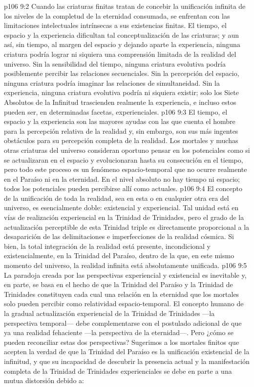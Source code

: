 \vs p106 9:2 Cuando las criaturas finitas tratan de concebir la unificación infinita de los niveles de la completud de la eternidad consumada, se enfrentan con las limitaciones intelectuales intrínsecas a sus existencias finitas. El tiempo, el espacio y la experiencia dificultan tal conceptualización de las criaturas; y aun así, sin tiempo, al margen del espacio y dejando aparte la experiencia, ninguna criatura podría lograr ni siquiera una comprensión limitada de la realidad del universo. Sin la sensibilidad del tiempo, ninguna criatura evolutiva podría posiblemente percibir las relaciones secuenciales. Sin la percepción del espacio, ninguna criatura podría imaginar las relaciones de simultaneidad. Sin la experiencia, ninguna criatura evolutiva podría ni siquiera existir; solo los Siete Absolutos de la Infinitud trascienden realmente la experiencia, e incluso estos pueden ser, en determinadas facetas, experienciales.
\vs p106 9:3 El tiempo, el espacio y la experiencia son las mayores ayudas con las que cuenta el hombre para la percepción relativa de la realidad y, sin embargo, son sus más ingentes obstáculos para su percepción completa de la realidad. Los mortales y muchas otras criaturas del universo consideran oportuno pensar en los potenciales como si se actualizaran en el espacio y evolucionaran hasta su consecución en el tiempo, pero todo este proceso es un fenómeno espacio\hyp{}temporal que no ocurre realmente en el Paraíso ni en la eternidad. En el nivel absoluto no hay tiempo ni espacio; todos los potenciales pueden percibirse allí como actuales.
\vs p106 9:4 El concepto de la unificación de toda la realidad, sea en esta o en cualquier otra era del universo, es esencialmente doble: existencial y experiencial. Tal unidad está en vías de realización experiencial en la Trinidad de Trinidades, pero el grado de la actualización perceptible de esta Trinidad triple es directamente proporcional a la desaparición de las delimitaciones e imperfecciones de la realidad cósmica. Si bien, la total integración de la realidad está presente, incondicional y existencialmente, en la Trinidad del Paraíso, dentro de la que, en este mismo momento del universo, la realidad infinita está absolutamente unificada.
\vs p106 9:5 \pc La paradoja creada por las perspectivas experiencial y existencial es inevitable y, en parte, se basa en el hecho de que la Trinidad del Paraíso y la Trinidad de Trinidades constituyen cada cual una relación en la eternidad que los mortales solo pueden percibir como relatividad espacio\hyp{}temporal. El concepto humano de la gradual actualización experiencial de la Trinidad de Trinidades ---la perspectiva temporal--- debe complementarse con el postulado adicional de que  ya una realidad fehaciente ---la perspectiva de la eternidad---. Pero ¿cómo se pueden reconciliar estas dos perspectivas? Sugerimos a los mortales finitos que acepten la verdad de que la Trinidad del Paraíso es la unificación existencial de la infinitud, y que su incapacidad de descubrir la presencia actual y la manifestación completa de la Trinidad de Trinidades experienciales se debe en parte a una mutua distorsión debido a:
